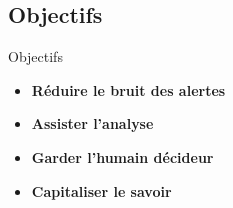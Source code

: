 \documentclass{beamer}
\begin{document}
\subsection{Objectifs}
\begin{frame}{Objectifs}
\small
\vspace{0.5em}
\begin{block}{}
\setlength{\itemsep}{7pt}
\begin{itemize}
  \item[\ding{45}] \textbf{Réduire le bruit des alertes}
  \item[\ding{45}] \textbf{Assister l'analyse}
  \item[\ding{45}] \textbf{Garder l'humain décideur}
  \item[\ding{45}] \textbf{Capitaliser le savoir}
\end{itemize}
\end{block}
\end{frame}
\end{document}
